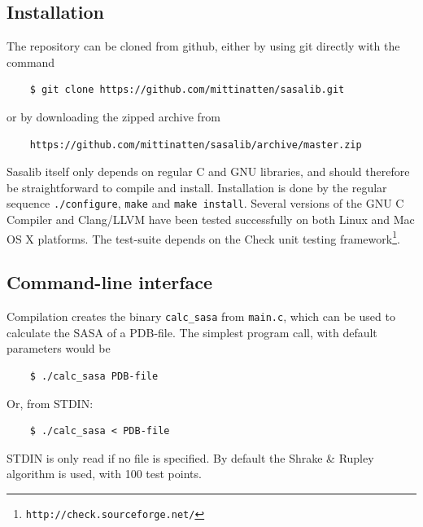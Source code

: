 \documentclass[a4paper,11pt]{article}
\begin{document}
\subsection{Installation} \label{sec:installing}

The repository can be cloned from github, either by using git directly
with the command
\begin{verbatim}
    $ git clone https://github.com/mittinatten/sasalib.git
\end{verbatim}
or by downloading the zipped archive from
\begin{verbatim}
    https://github.com/mittinatten/sasalib/archive/master.zip
\end{verbatim}
Sasalib itself only depends on regular C and GNU libraries, and should
therefore be straightforward to compile and install. Installation is
done by the regular sequence \verb|./configure|, \verb|make| and
\verb|make install|. Several versions of the GNU C Compiler and
Clang/LLVM have been tested successfully on both Linux and Mac OS X
platforms. The test-suite depends on the Check unit testing
framework\footnote{\texttt{http://check.sourceforge.net/}}.

\subsection{Command-line interface}

Compilation creates the binary \verb|calc_sasa| from
\verb|main.c|, which can be used to calculate the SASA of a
PDB-file. The simplest program call, with default parameters would be
\begin{verbatim}
    $ ./calc_sasa PDB-file
\end{verbatim}
Or, from STDIN:
\begin{verbatim} 
    $ ./calc_sasa < PDB-file    
\end{verbatim}
STDIN is only read if no file is specified.  By default the Shrake \&
Rupley algorithm is used, with 100 test points. 
\end{document}

